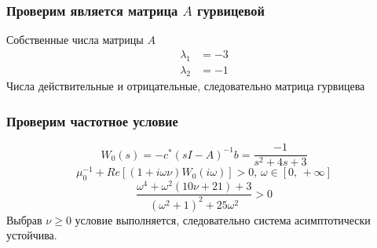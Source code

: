     \subsubsection*{Проверим является матрица $A$ гурвицевой}
    Собственные числа матрицы $A$
    \begin{equation*}
        \begin{aligned}
            \lambda_1 &= -3 \\
            \lambda_2 &= -1
        \end{aligned}
    \end{equation*}
    Числа действительные и отрицательные, следовательно матрица гурвицева

    \subsubsection*{Проверим частотное условие}
    \[W_0(s) = -c^*(sI - A)^{-1}b = \dfrac{-1}{s^2 + 4s + 3}\]
    \[\mu_0^{-1} + Re\left[ \left( 1 + i\omega\nu \right) W_0(i\omega) \right] > 0, \,
    \omega \in \left[ 0,\, +\infty \right]\]
    \[\dfrac{\omega^4 + \omega^2(10\nu +21) + 3}{(\omega^2 + 1)^2 +25\omega^2} > 0 \]
    Выбрав $\nu \geq 0$ условие выполняется, следовательно система асимптотически устойчива.



